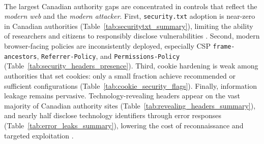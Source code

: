 \documentclass[pdflatex,sn-mathphys-num]{sn-jnl}
\numberwithin{equation}{section}
\theoremstyle{thmstyleone}
\theoremstyle{thmstyletwo}%
\theoremstyle{thmstylethree}%
\begin{document}
\paragraph{\color{red}{RQ4: Which controls exhibit the largest adoption gaps in Canada?}}
The largest Canadian authority gaps are concentrated in controls that reflect the \emph{modern web} and the \emph{modern attacker}.
First, \texttt{security.txt} adoption is near-zero in Canadian authorities (Table~\ref{tab:securitytxt_summary}),
limiting the ability of researchers and citizens to responsibly disclose vulnerabilities \cite{rfc9116}. Second,
modern browser-facing policies are inconsistently deployed, especially CSP \texttt{frame-ancestors}, \texttt{Referrer-Policy}, and
\texttt{Permissions-Policy} (Table~\ref{tab:security_headers_presence}). Third, cookie hardening is weak
among authorities that set cookies: only a small fraction achieve recommended or sufficient configurations (Table~\ref{tab:cookie_security_flags}).
Finally, information leakage remains pervasive. Technology-revealing headers appear on the vast
majority of Canadian authority sites (Table~\ref{tab:revealing_headers_summary}), and nearly half
disclose technology identifiers through error responses (Table~\ref{tab:error_leaks_summary}), lowering the
cost of reconnaissance and targeted exploitation \cite{owasp_secure_headers_project,owasp_http_security_response_headers,cwe_200,cwe_209}.

\end{document}
